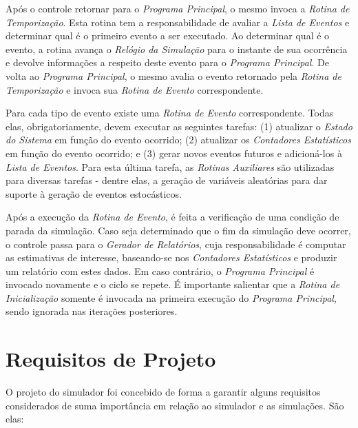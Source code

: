Após o controle retornar para o \textit{Programa Principal}, o mesmo invoca a
\textit{Rotina de Temporização}. Esta rotina tem a responsabilidade de avaliar a
\textit{Lista de Eventos} e determinar qual é o primeiro evento a ser executado.
Ao determinar qual é o evento, a rotina avança o \textit{Relógio da Simulação}
para o instante de sua ocorrência e devolve informações a respeito deste evento
para o \textit{Programa Principal}. De volta ao \textit{Programa Principal}, o
mesmo avalia o evento retornado pela \textit{Rotina de Temporização} e invoca
sua \textit{Rotina de Evento} correspondente.

Para cada tipo de evento existe uma \textit{Rotina de Evento} correspondente.
Todas elas, obrigatoriamente, devem executar as seguintes tarefas: (1) atualizar
o \textit{Estado do Sistema} em função do evento ocorrido; (2) atualizar os
\textit{Contadores Estatísticos} em função do evento ocorrido; e (3) gerar
novos eventos futuros e adicioná-los à \textit{Lista de Eventos}. Para esta
última tarefa, as \textit{Rotinas Auxiliares} são utilizadas para diversas
tarefas - dentre elas, a geração de variáveis aleatórias para dar suporte à
geração de eventos estocásticos.

Após a execução da \textit{Rotina de Evento}, é feita a verificação de uma
condição de parada da simulação. Caso seja determinado que o fim da simulação
deve ocorrer, o controle passa para o \textit{Gerador de Relatórios}, cuja
responsabilidade é computar as estimativas de interesse, baseando-se nos
\textit{Contadores Estatísticos} e produzir um relatório com estes dados. Em
caso contrário, o \textit{Programa Principal} é invocado novamente e o ciclo se
repete. É importante salientar que a \textit{Rotina de Inicialização} somente é
invocada na primeira execução do \textit{Programa Principal}, sendo ignorada nas
iterações posteriores.

\section{\label{simulator:requirements}Requisitos de Projeto}

O projeto do simulador foi concebido de forma a garantir alguns requisitos
considerados de suma importância em relação ao simulador e as simulações. São
elas:

